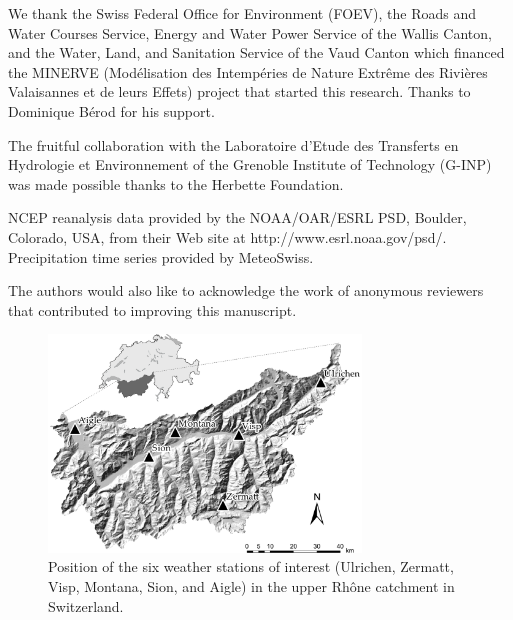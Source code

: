 \documentclass[hess, manuscript]{copernicus}
\begin{document}
		
	
	
	
	\begin{acknowledgements}
		We thank the Swiss Federal Office for Environment (FOEV), the Roads and Water Courses Service, Energy and Water Power Service of the Wallis Canton, and the Water, Land, and Sanitation Service of the Vaud Canton which financed the MINERVE (Mod\'{e}lisation des Intemp\'{e}ries de Nature Extr\^{e}me des Rivi\`{e}res Valaisannes et de leurs Effets) project that started this research. Thanks to Dominique B\'{e}rod for his support.
		
		The fruitful collaboration with the Laboratoire d'Etude des Transferts en Hydrologie et Environnement of the Grenoble Institute of Technology (G-INP) was made possible thanks to the Herbette Foundation. 
		
		NCEP reanalysis data provided by the NOAA/OAR/ESRL PSD, Boulder, Colorado, USA, from their Web site at http://www.esrl.noaa.gov/psd/. Precipitation time series provided by MeteoSwiss.
		
		The authors would also like to acknowledge the work of anonymous reviewers that contributed to improving this manuscript. 
	\end{acknowledgements}
	
	
	
	
	
	
	
	
	
	
	\begin{figure}[htb]
		\begin{center}
			\includegraphics[width=8.3cm]{fig01.pdf}
		\end{center}
		\caption{Position of the six weather stations of interest (Ulrichen, Zermatt, Visp, Montana, Sion, and Aigle) in the upper Rh\^{o}ne catchment in Switzerland.}
		\label{fig:map}
	\end{figure}
	
\end{document}
